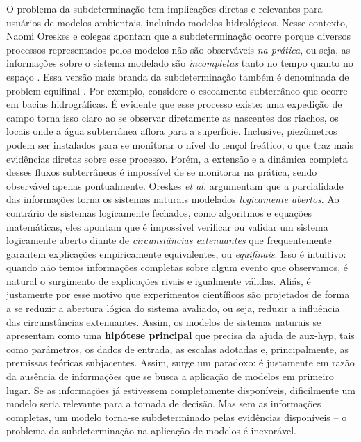 \documentclass[./main.tex]{subfiles}
\begin{document}
\par O problema da subdeterminação tem implicações diretas e relevantes para usuários de modelos ambientais, incluindo modelos hidrológicos. Nesse contexto, Naomi Oreskes e colegas apontam que a subdeterminação ocorre porque diversos processos representados pelos modelos não são observáveis \textit{na prática}, ou seja, as informações sobre o sistema modelado são \textit{incompletas} tanto no tempo quanto no espaço \cite{Oreskes1994}. Essa versão mais branda da subdeterminação também é denominada de \gls{problem-equifinal} \cite{Beven2006}. Por exemplo, considere o escoamento subterrâneo que ocorre em bacias hidrográficas. É evidente que esse processo existe: uma expedição de campo torna isso claro ao se observar diretamente as nascentes dos riachos, os locais onde a água subterrânea aflora para a superfície. Inclusive, piezômetros podem ser instalados para se monitorar o nível do lençol freático, o que traz mais evidências diretas sobre esse processo. Porém, a extensão e a dinâmica completa desses fluxos subterrâneos é impossível de se monitorar na prática, sendo observável apenas pontualmente. Oreskes \textit{et al.} argumentam que a parcialidade das informações torna os sistemas naturais modelados \textit{logicamente abertos}. Ao contrário de sistemas logicamente fechados, como algoritmos e equações matemáticas, eles apontam que é impossível verificar ou validar um sistema logicamente aberto diante de \textit{circunstâncias extenuantes} que frequentemente garantem explicações empiricamente equivalentes, ou \textit{equifinais}. Isso é intuitivo: quando não temos informações completas sobre algum evento que observamos, é natural o surgimento de explicações rivais e igualmente válidas. Aliás, é justamente por esse motivo que experimentos científicos são projetados de forma a se reduzir a abertura lógica do sistema avaliado, ou seja, reduzir a influência das circunstâncias extenuantes. Assim, os modelos de sistemas naturais se apresentam como uma \textbf{hipótese principal} que precisa da ajuda de \gls{aux-hyp}, tais como parâmetros, os dados de entrada, as escalas adotadas e, principalmente, as premissas teóricas subjacentes. Assim, surge um paradoxo: é justamente em razão da ausência de informações que se busca a aplicação de modelos em primeiro lugar. Se as informações já estivessem completamente disponíveis, dificilmente um modelo seria relevante para a tomada de decisão. Mas sem as informações completas, um modelo torna-se subdeterminado pelas evidências disponíveis -- o problema da subdeterminação na aplicação de modelos é inexorável.
\end{document}
